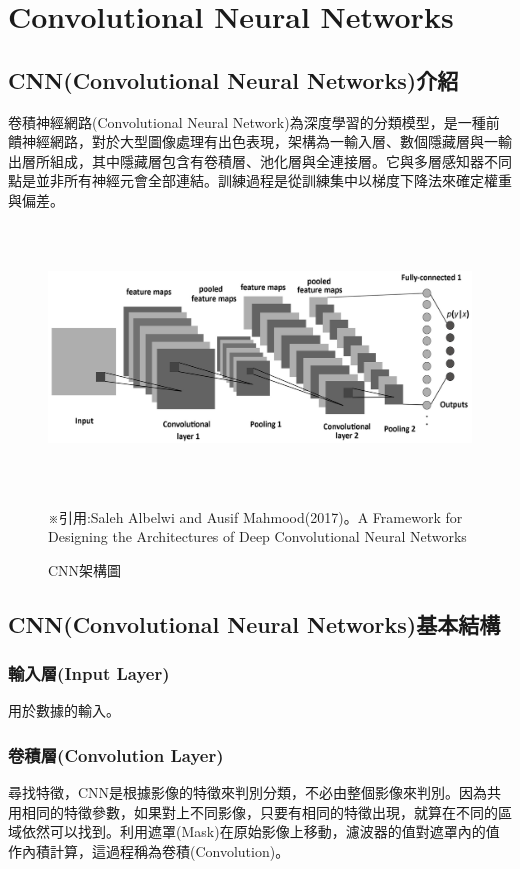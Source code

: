 \chapter{Convolutional Neural Networks}
\label{chapter:intro}
\section{CNN(Convolutional Neural Networks)介紹}
卷積神經網路(Convolutional Neural Network)為深度學習的分類模型，是一種前饋神經網路，對於大型圖像處理有出色表現，架構為一輸入層、數個隱藏層與一輸出層所組成，其中隱藏層包含有卷積層、池化層與全連接層。它與多層感知器不同點是並非所有神經元會全部連結。訓練過程是從訓練集中以梯度下降法來確定權重與偏差。
\begin{figure}[H]
	\centerline{\includegraphics[height=7cm]{pic/CNNAR.png}}
	\caption{CNN架構圖}
	※引用:Saleh Albelwi and Ausif Mahmood(2017)。A Framework for Designing the Architectures of Deep Convolutional Neural Networks

	\label{fig:CNNArchiteture}
\end{figure}


\label{sec:background}
\section{CNN(Convolutional Neural Networks)基本結構}
\subsection{輸入層(Input Layer)}
用於數據的輸入。
\subsection{卷積層(Convolution Layer)}

尋找特徵，CNN是根據影像的特徵來判別分類，不必由整個影像來判別。因為共用相同的特徵參數，如果對上不同影像，只要有相同的特徵出現，就算在不同的區域依然可以找到。利用遮罩(Mask)在原始影像上移動，濾波器的值對遮罩內的值作內積計算，這過程稱為卷積(Convolution)。


